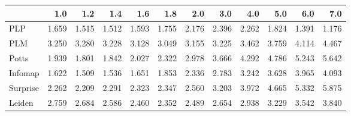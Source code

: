 \begin{tabular}{lrrrrrrrrrrr}
\toprule
{} &   1.0 &   1.2 &   1.4 &   1.6 &   1.8 &   2.0 &   3.0 &   4.0 &   5.0 &   6.0 &   7.0 \\
\midrule
PLP      & 1.659 & 1.515 & 1.512 & 1.593 & 1.755 & 2.176 & 2.396 & 2.262 & 1.824 & 1.391 & 1.176 \\
PLM      & 3.250 & 3.280 & 3.228 & 3.128 & 3.049 & 3.155 & 3.225 & 3.462 & 3.759 & 4.114 & 4.467 \\
Potts    & 1.939 & 1.801 & 1.842 & 2.027 & 2.322 & 2.978 & 3.666 & 4.292 & 4.786 & 5.243 & 5.642 \\
Infomap  & 1.622 & 1.509 & 1.536 & 1.651 & 1.853 & 2.336 & 2.783 & 3.242 & 3.628 & 3.965 & 4.093 \\
Surprise & 2.262 & 2.209 & 2.291 & 2.323 & 2.347 & 2.560 & 3.203 & 3.972 & 4.665 & 5.332 & 5.875 \\
Leiden   & 2.759 & 2.684 & 2.586 & 2.460 & 2.352 & 2.489 & 2.654 & 2.938 & 3.229 & 3.542 & 3.840 \\
\bottomrule
\end{tabular}
